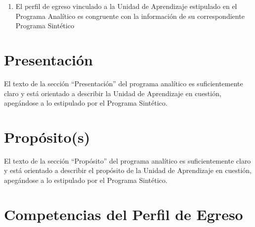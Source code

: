 \documentclass{article}
\begin{document}
\begin{Form}
\begin{enumerate}[resume,leftmargin=*,itemsep=-2pt]
\item{El perfil de egreso vinculado a la Unidad de Aprendizaje
  estipulado en el Programa Anal\'{i}tico es congruente con la
  informaci\'{o}n de su correspondiente Programa Sint\'{e}tico   \hfill {}%
  \quad%
  }

\end{enumerate}
  
\section{Presentaci\'{o}n}

El texto de la secci\'{o}n ``Presentaci\'{o}n'' del programa
anal\'{i}tico es suficientemente claro y est\'{a} orientado a
describir la Unidad de Aprendizaje en cuesti\'{o}n, apeg\'{a}ndose a
lo estipulado por el Programa Sint\'{e}tico.
\begin{flushright}
%
  \quad%
\end{flushright}
  
\section{Prop\'{o}sito(s)}

El texto de la secci\'{o}n ``Prop\'{o}sito'' del programa
anal\'{i}tico es suficientemente claro y est\'{a} orientado a
describir el prop\'{o}sito de la Unidad de Aprendizaje en
cuesti\'{o}n, apeg\'{a}ndose a lo estipulado por el Programa
Sint\'{e}tico.
\begin{flushright}
%
  \quad%
\end{flushright}
  
\section{Competencias del Perfil de Egreso}


\end{Form}
\end{document}
